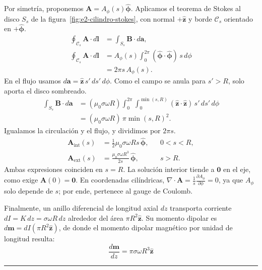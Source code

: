 \documentclass[11pt]{article}
\begin{document}
Por simetría, proponemos $\mathbf A=A_\phi(s)\hat{\boldsymbol\phi}$.
Aplicamos el teorema de Stokes al disco $S_s$ de la
figura~\ref{fig:e2-cilindro-stokes}, con normal $+\hat{\mathbf z}$ y
borde $\mathcal C_s$ orientado en $+\hat{\boldsymbol\phi}$.
\begin{align*}
    \oint_{\mathcal C_s}\mathbf A\cdot d\mathbf l
    &=\int_{S_s}\mathbf B\cdot d\mathbf a,\\
    \oint_{\mathcal C_s}\mathbf A\cdot d\mathbf l
    &=A_\phi(s)\int_0^{2\pi}
        (\hat{\boldsymbol\phi}\cdot\hat{\boldsymbol\phi})\,s\,d\phi\\
    &=2\pi s\,A_\phi(s).
\end{align*}
En el flujo usamos $d\mathbf a=\hat{\mathbf z}\,s'\,ds'\,d\phi$.
Como el campo se anula para $s'>R$, solo aporta el disco sombreado.
\begin{align*}
    \int_{S_s}\mathbf B\cdot d\mathbf a
    &=(\mu_0\sigma\omega R)
      \int_0^{2\pi}\!\int_0^{\min(s,R)}
       (\hat{\mathbf z}\cdot\hat{\mathbf z})\,s'\,ds'\,d\phi\\
    &=(\mu_0\sigma\omega R)\,\pi\min(s,R)^2.
\end{align*}
Igualamos la circulación y el flujo, y dividimos por $2\pi s$.
\begin{align*}
    \mathbf A_{\mathrm{int}}(s)
    &=\frac12\mu_0\sigma\omega R s\,\hat{\boldsymbol\phi},
      &&0<s<R,\\
    \mathbf A_{\mathrm{ext}}(s)
    &=\frac{\mu_0\sigma\omega R^3}{2s}\,\hat{\boldsymbol\phi},
      &&s>R.
\end{align*}
Ambas expresiones coinciden en $s=R$. La solución interior tiende
a $\mathbf0$ en el eje, como exige $\mathbf A(0)=\mathbf0$.
En coordenadas cilíndricas, $\nabla \cdot \mathbf{A} = \frac{1}{s}\frac{\partial A_\phi}{\partial \phi} = 0$, ya que $A_\phi$ solo depende de $s$; por ende, pertenece al gauge de Coulomb.

Finalmente, un anillo diferencial de longitud axial $dz$ transporta corriente $dI = K\, dz = \sigma \omega R\, dz$ alrededor del área $\pi R^2 \hat{\mathbf{z}}$. Su momento dipolar es $d\mathbf{m} = dI (\pi R^2 \hat{\mathbf{z}})$, de donde el momento dipolar magnético por unidad de longitud resulta:
\begin{equation}
    \frac{d\mathbf{m}}{dz} = \pi \sigma \omega R^3 \hat{\mathbf{z}}
\end{equation}

\vspace{0.4cm}
\hrule
\vspace{0.5cm}
\end{document}
